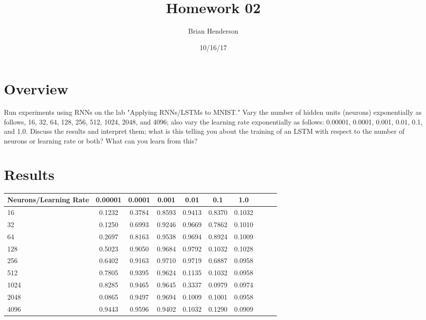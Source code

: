 \documentclass[a4paper]{article}
\title{Homework 02}
\author{Brian Henderson}
\date{10/16/17}
\begin{document}
\lstset{language=Python}

\maketitle

\section{Overview}
Run experiments using RNNs on the lab "Applying RNNs/LSTMs to MNIST." Vary the number of hidden units (neurons) exponentially as follows, 16, 32, 64, 128, 256, 512, 1024, 2048, and 4096; also vary the learning rate exponentially as follows: 0.00001, 0.0001, 0.001, 0.01, 0.1, and 1.0. Discuss the results and interpret them; what is this telling you about the training of an LSTM with respect to the number of neurons or learning rate or both? What can you learn from this?
\\
\section{Results}
\begin{center}
\begin{tabular}{l*{8}{c}r}
Neurons/Learning Rate        & 0.00001 & 0.0001 & 0.001 & 0.01 & 0.1  & 1.0 \\
\hline
16	& 0.1232 & 0.3784 & 0.8593 & 0.9413 & 0.8370 & 0.1032 \\
32	& 0.1250 & 0.6993 & 0.9246 & 0.9669 & 0.7862 & 0.1010 \\
64	& 0.2697 & 0.8163 & 0.9538 & 0.9694 & 0.8924 & 0.1009 \\
128	& 0.5023 & 0.9050 & 0.9684 & 0.9792 & 0.1032 & 0.1028 \\
256	& 0.6402 & 0.9163 & 0.9710 & 0.9719 & 0.6887 & 0.0958 \\
512	& 0.7805 & 0.9395 & 0.9624 & 0.1135 & 0.1032 & 0.0958 \\
1024	& 0.8285 & 0.9465 & 0.9645 & 0.3337 & 0.0979 & 0.0974 \\
2048	& 0.0865 & 0.9497 & 0.9694 & 0.1009 & 0.1001 & 0.0958 \\
4096	& 0.9443 & 0.9596 & 0.9402 & 0.1032 & 0.1290 & 0.0909 \\

\end{tabular}
\end{center}
\end{document}
